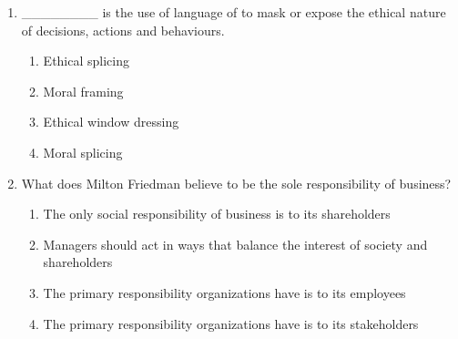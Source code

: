 \documentclass[12pt]{article}
\begin{document}
\begin{enumerate}[label=\arabic*.]
\begin{enumerate}[label=(\alph*)]
\end{enumerate}
\item \_\_\_\_\_\_\_\_ is the use of language of to mask or expose the ethical nature of decisions, actions and behaviours.
\begin{enumerate}[label=(\alph*)]
    \item Ethical splicing
    \item Moral framing
    \item Ethical window dressing
    \item Moral splicing
\end{enumerate}
\item What does Milton Friedman believe to be the sole responsibility of business?
\begin{enumerate}[label=(\alph*)]
    \item The only social responsibility of business is to its shareholders
    \item Managers should act in ways that balance the interest of society and shareholders
    \item The primary responsibility organizations have is to its employees
    \item The primary responsibility organizations have is to its stakeholders
\end{enumerate}
\end{enumerate}
\end{document}
